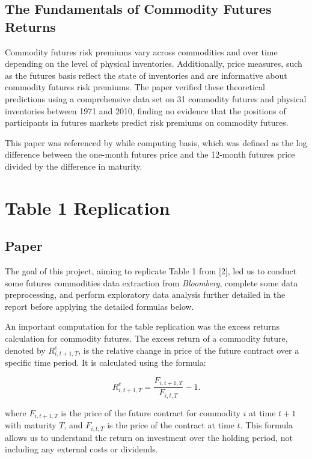 \documentclass{article}
\begin{document}
\subsection{The Fundamentals of Commodity Futures Returns}

Commodity futures risk premiums vary across commodities and over time depending on the level of physical inventories. Additionally, price measures, such as the futures basis reflect the state of inventories and are informative about commodity futures risk premiums. The paper verified these theoretical predictions using a comprehensive data set on 31 commodity futures and physical inventories between 1971 and 2010, finding no evidence that the positions of participants in futures markets predict risk premiums on commodity futures.

This paper was referenced by \cite{ref2} while computing basis, which was defined as the log difference between the one-month futures price and the 12-month futures price divided by the difference in maturity.

\section{Table 1 Replication}
\subsection{Paper}

The goal of this project, aiming to replicate Table 1 from [2], led us to conduct some futures commodities data extraction from \textit{Bloomberg}, complete some data preprocessing, and perform exploratory data analysis further detailed in the report before applying the detailed formulas below.

An important computation for the table replication was the excess returns calculation for commodity futures. The excess return of a commodity future, denoted by \( R^e_{i,t+1,T} \), is the relative change in price of the future contract over a specific time period. It is calculated using the formula:

\[
R^e_{i,t+1,T} = \frac{F_{i,t+1,T}}{F_{i,t,T}} - 1.
\]

where \( F_{i,t+1,T} \) is the price of the future contract for commodity \( i \) at time \( t+1 \) with maturity \( T \), and \( F_{i,t,T} \) is the price of the contract at time \( t \). This formula allows us to understand the return on investment over the holding period, not including any external costs or dividends.
\end{document}
